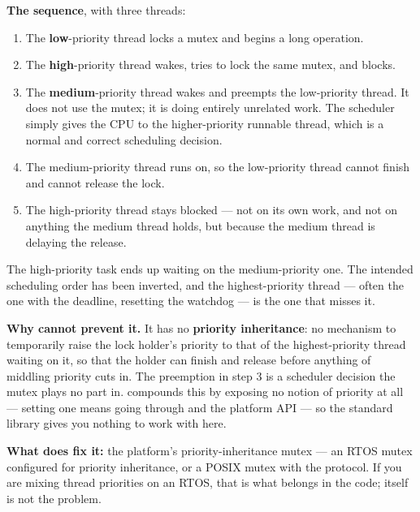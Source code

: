 \textbf{The sequence}, with three threads: 
\begin{enumerate}
  \item The \textbf{low}-priority thread locks a mutex and begins a long operation.
  \item The \textbf{high}-priority thread wakes, tries to lock the same mutex, and blocks.
  \item The \textbf{medium}-priority thread wakes and preempts the low-priority thread. It does not
    use the mutex; it is doing entirely unrelated work. The scheduler simply gives the CPU to the
    higher-priority runnable thread, which is a normal and correct scheduling decision.
  \item The medium-priority thread runs on, so the low-priority thread cannot finish and cannot
    release the lock.
  \item The high-priority thread stays blocked --- not on its own work, and not on anything the
    medium thread holds, but because the medium thread is delaying the release.
\end{enumerate}

The high-priority task ends up waiting on the medium-priority one. The intended scheduling order has
been inverted, and the highest-priority thread --- often the one with the deadline, resetting the
watchdog --- is the one that misses it.

\textbf{Why  cannot prevent it.} It has no \textbf{priority inheritance}: no
mechanism to temporarily raise the lock holder's priority to that of the highest-priority thread
waiting on it, so that the holder can finish and release before anything of middling priority cuts
in. The preemption in step 3 is a scheduler decision the mutex plays no part in. 
compounds this by exposing no notion of priority at all --- setting one means going through
 and the platform API --- so the standard library gives you nothing to work
with here. 

\textbf{What does fix it:} the platform's priority-inheritance mutex --- an RTOS mutex configured
for priority inheritance, or a POSIX mutex with the  protocol. If you
are mixing thread priorities on an RTOS, that is what belongs in the code; 
itself is not the problem. 
